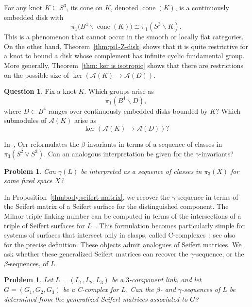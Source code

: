 \documentclass[a4paper, 11pt]{amsart}
\newcommand{\red}{\textcolor{red}}
\newcommand{\chris}[1]{\red{[Chris] #1}}
\newtheorem{problem}[theorem]{Problem}
\theoremstyle{definition}
\newtheorem{question}[theorem]{Question}
\begin{document}
For any knot $K\subseteq S^3$, its cone on $K$, denoted  $\operatorname{cone}(K)$, is a continuously embedded disk with
\[
\pi_1\bigl(B^4\smallsetminus \operatorname{cone}(K)\bigr)
\cong
\pi_1(S^3\smallsetminus K).
\]
This is a phenomenon that cannot occur in the smooth or locally flat categories. On the other hand, Theorem~\ref{thm:pi1-Z-disk} shows that it is quite restrictive for a knot to bound a disk whose complement has infinite cyclic fundamental group. More generally, Theorem~\ref{thm: ker is isotropic} shows that there are restrictions on the possible size of
$\ker(\mathcal{A}(K)\to \mathcal{A}(D))$.

\begin{question}
Fix a knot $K$. Which groups arise as
\[
\pi_1(B^4\smallsetminus D),
\]
where $D\subset B^4$ ranges over continuously embedded disks bounded by $K$? Which submodules of $\mathcal{A}(K)$ arise as
\[
\ker(\mathcal{A}(K)\to \mathcal{A}(D))?
\]
\end{question}



In~\cite{Orr:1991}, Orr reformulates the $\beta$-invariants in terms of a sequence of classes in $\pi_3(S^2\vee S^3)$. Can an analogous interpretation be given for the $\gamma$-invariants?

\begin{problem}
Can $\gamma(L)$ be interpreted as a sequence of classes in $\pi_3(X)$ for some fixed space $X$?
\end{problem}

In Proposition~\ref{thmbody:seifert-matrix}, we recover the $\gamma$-sequence in terms of the Seifert matrix of a Seifert surface for the distinguished component. The Milnor triple linking number can be computed in terms of the intersections of a triple of Seifert surfaces for $L$~\cite{MelMel03}. This formulation becomes particularly simple for systems of surfaces that intersect only in clasps, called C-complexes~\cite{DaRo2017}; see also~\cite{Cooper82,Cimasoni04} for the precise definition. These objects admit analogues of Seifert matrices. We ask whether these generalized Seifert matrices can recover the $\gamma$-sequence, or the $\beta$-sequences, of $L$.

\begin{problem}
Let $L=(L_1,L_2,L_3)$ be a $3$-component link, and let $G=(G_1,G_2,G_3)$ be a C-complex for $L$. Can the $\beta$- and $\gamma$-sequences of $L$ be determined from the generalized Seifert matrices associated to $G$?
\end{problem}
\end{document}
